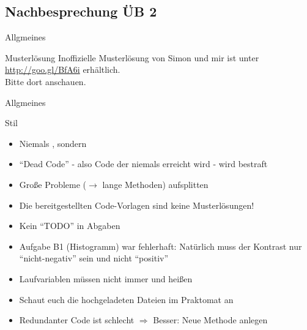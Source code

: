 \documentclass[usepdftitle=false,hyperref={pdfpagelabels=false}]{beamer}
\begin{document}
\subsection{Nachbesprechung ÜB 2}
\begin{frame}{Allgmeines}
    \begin{block}{Musterlösung}
        Inoffizielle Musterlösung von Simon und mir ist unter
        \href{http://goo.gl/BfA6i}{http://goo.gl/BfA6i} erhältlich.\\
        Bitte dort anschauen.
    \end{block}
\end{frame}

\begin{frame}{Allgmeines}
  \begin{block}{Stil}
    \begin{itemize}[<+->]
        \item Niemals , sondern 
        \item "`Dead Code"' - also Code der niemals erreicht wird - wird bestraft
        \item Große Probleme ($\rightarrow$ lange Methoden) aufsplitten
    \end{itemize}
  \end{block}

    \begin{itemize}[<+->]
        \item Die bereitgestellten Code-Vorlagen sind keine Musterlösungen!
        \item Kein "`TODO"' in Abgaben
        \item Aufgabe B1 (Histogramm) war fehlerhaft: Natürlich muss der Kontrast nur "`nicht-negativ"' sein und nicht "`positiv"'
        \item Laufvariablen müssen nicht immer  und  heißen
        \item Schaut euch die hochgeladeten Dateien im Praktomat an
        \item Redundanter Code ist schlecht $\Rightarrow$ Besser: Neue Methode anlegen
    \end{itemize}
\end{frame}
\end{document}
